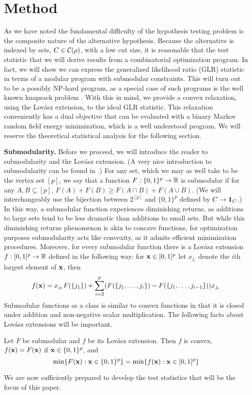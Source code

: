 \vspace{-.2cm}
\section{Method}
\label{sec:method}
\vspace{-.2cm}
As we have noted the fundamental difficulty of the hypothesis testing problem is the composite nature of the alternative hypothesis.
Because the alternative is indexed by sets, $C \in \mathcal{C}(\rho)$, with a low cut size, it is reasonable that the test statistic that we will derive results from a combinatorial optimization program.
In fact, we will show we can express the generalized likelihood ratio (GLR) statistic in terms of a modular program with submodular constraints.
This will turn out to be a possibly NP-hard program, as a special case of such programs is the well known knapsack problem \cite{papadimitriou1998combinatorial}.
With this in mind, we provide a convex relaxation, using the Lov\'asz extension, to the ideal GLR statistic.
This relaxation conveniently has a dual objective that can be evaluated with a binary Markov random field energy minimization, which is a well understood program.
We will reserve the theoretical statistical analysis for the following section.

{\bf Submodularity.} Before we proceed, we will introduce the reader to submodularity and the Lov\'asz extension. (A very nice introduction to submodularity can be found in \cite{bach2010convex}.)
For any set, which we may as well take to be the vertex set $[p]$, we say that a function $F : \{0,1\}^p \rightarrow \mathbb{R}$ is submodular if for any $A,B \subseteq [p]$, $F(A) + F(B) \ge F(A \cap B) + F(A \cup B)$. (We will interchangeably use the bijection between $2^{[p]}$ and $\{0,1\}^p$ defined by $C \to {\bf 1}_C$.)
In this way, a submodular function experiences diminishing returns, as additions to large sets tend to be less dramatic than additions to small sets.
But while this diminishing returns phenomenon is akin to concave functions, for optimization purposes submodularity acts like convexity, as it admits efficient minimization procedures.
Moreover, for every submodular function there is a Lov\'asz extension $f : [0,1]^p \rightarrow \mathbb{R}$ defined in the following way: for $\mathbf{x} \in [0,1]^p$ let $x_{j_i}$ denote the $i$th largest element of $\mathbf{x}$, then
\[
f(\mathbf{x}) = x_{j_1} F(\{j_1\}) + \sum_{i=2}^{p} (F(\{ j_1,\ldots,j_i \}) - F(\{ j_1,\ldots,j_{i-1} \})) x_{j_i}
\]
Submodular functions as a class is similar to convex functions in that it is closed under addition and non-negative scalar multiplication.
The following facts about Lov\'asz extensions will be important.
\begin{proposition}{\cite{bach2010convex}}
\label{prop:submod}
Let $F$ be submodular and $f$ be its Lov\'asz extension. Then $f$ is convex, $f(\mathbf{x}) = F(\mathbf{x})$ if $\mathbf{x} \in \{0,1\}^p$, and 
\[
\min \{ F(\mathbf{x}) : \mathbf{x} \in \{0,1\}^p \} = \min \{ f(\mathbf{x}) : \mathbf{x} \in [0,1]^p \}
\]
\end{proposition}
We are now sufficiently prepared to develop the test statistics that will be the focus of this paper.
\vspace{-.1cm}
